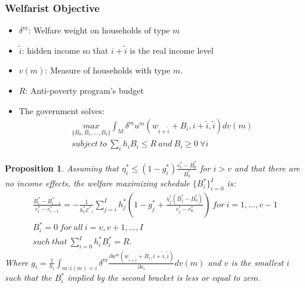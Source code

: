 \documentclass[xcolor=pdftex,dvipsnames,table]{beamer}
\newtheorem{prop}{Proposition}
\begin{document}
\begin{frame}[label=welfare]
 \frametitle{Welfarist Objective}
\begin{itemize}
\item $\delta^m$: Welfare weight on households of type $m$
\pause
\item $\tilde{i}$: hidden income so that $i+\tilde{i}$ is the real income level
\pause
\item $v(m)$: Measure of households with type $m$. 
\pause
\item $R$: Anti-poverty program's budget
\pause
\item The government solves:
\begin{align*}
\underset{\{B_0,B_1,...,B_I\}}{max} \int_M \delta^m u^m(w_{i+\tilde{i}}+B_i,i+\tilde{i},\tilde{i})dv(m)\\
subject\ to\ \sum_i h_iB_i \leq R\ and\ B_i\geq 0\ \forall i\nonumber
\end{align*}
\end{itemize}
\end{frame}

\begin{frame}[label=prop_wel]
\begin{prop}
	\label{prop_welfare}
	Assuming that $\eta^{*}_i\leq (1-g^*_i)\frac{c^*_i-B_0^*}{B_0^*}$ for $i>v$ and that there are no income effects, the welfare maximizing schedule $\{B^*_i\}_{i=0}^I$ is:
	\begin{align*}	
	\frac{B_i^*-B_{i-1}^*}{c^*_i-c^*_{i-1}}=-\frac{1}{h^*_i\mathcal{E^*}_i}\sum_{j=i}^{I}h^*_j\left(1-g^*_j+\frac{\eta^*_j(B_j^*-B_0^*)}{c^*_j-c_0^*}\right)\ for\ i =1,...,v-1\\
	B^*_i = 0\ for\ all\ i = v, v+1, ...,I \nonumber\\
	such\ that\ \sum_{i=0}^I h^*_i B^*_i = R. \nonumber
	\end{align*}
	Where $g_i=\frac{1}{h_i}\int_{m:i(m)=i} \delta^m \frac{\partial u^m(w_{i+\tilde{i}}+B_i,i+\tilde{i},\tilde{i})}{\partial c_i} dv(m)$ and $v$ is the smallest $i$ such that the $B^*_i$ implied by the second bracket is less or equal to zero. 
\end{prop}
\end{frame}
\end{document}

